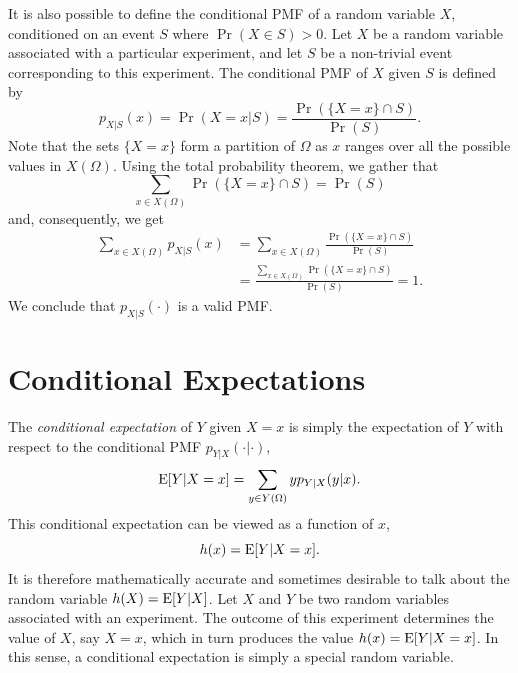 It is also possible to define the conditional PMF of a random variable $X$, conditioned on an event $S$ where $\Pr (X \in S) > 0$.
Let $X$ be a random variable associated with a particular experiment, and let $S$ be a non-trivial event corresponding to this experiment.
The conditional PMF of $X$ given $S$ is defined by
\begin{equation} \label{equation:ConditionalEventPMF}
p_{X|S} (x) = \Pr (X = x | S)
= \frac{\Pr (\{X = x\} \cap S)}{\Pr (S)} .
\end{equation}
Note that the sets $\{ X = x \}$ form a partition of $\Omega$ as $x$ ranges over all the possible values in $X (\Omega)$.
Using the total probability theorem, we gather that
\begin{equation*}
\sum_{x \in X(\Omega)} \Pr ( \{X = x\} \cap S) = \Pr (S)
\end{equation*}
and, consequently, we get
\begin{equation*}
\begin{split}
\sum_{x \in X(\Omega)} p_{X|S} (x)
&= \sum_{x \in X(\Omega)} \frac{\Pr (\{X = x\} \cap S)}{\Pr (S)} \\
&= \frac{\sum_{x \in X(\Omega)} \Pr (\{X = x\} \cap S)}{\Pr (S)}
=1 .
\end{split}
\end{equation*}
We conclude that $p_{X|S} (\cdot)$ is a valid PMF.



\section{Conditional Expectations}

The \emph{conditional expectation} of $Y$ given $X = x$ is simply the expectation of $Y$ with respect to the conditional PMF $p_{Y|X} (\cdot | \cdot)$, 
\begin{equation*}
\mathrm{E} [Y | X = x ] = \sum_{y \in Y(\Omega)} y p_{Y|X} (y|x).
\end{equation*}
This conditional expectation can be viewed as a function of $x$,
\begin{equation*}
h(x) = \mathrm{E} [Y | X = x] .
\end{equation*}
It is therefore mathematically accurate and sometimes desirable to talk about the random variable $h (X) = \mathrm{E} [Y | X]$.
Let $X$ and $Y$ be two random variables associated with an experiment.
The outcome of this experiment determines the value of $X$, say $X = x$, which in turn produces the value $h(x) = \mathrm{E} [Y | X = x]$.
In this sense, a conditional expectation is simply a special random variable.

